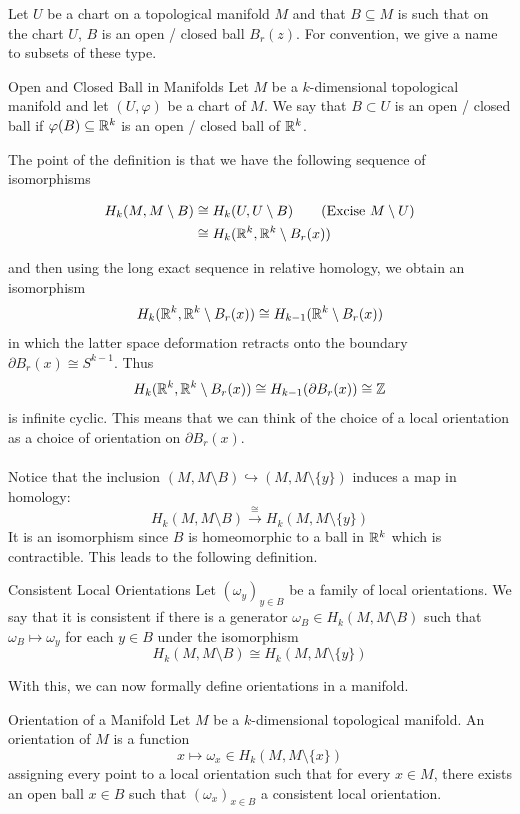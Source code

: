\documentclass[a4paper]{article}
\begin{document}
Let $U$ be a chart on a topological manifold $M$ and that $B\subseteq M$ is such that on the chart $U$, $B$ is an open / closed ball $B_r(z)$. For convention, we give a name to subsets of these type. 

\begin{defn}{Open and Closed Ball in Manifolds}{} Let $M$ be a $k$-dimensional topological manifold and let $(U,\varphi)$ be a chart of $M$. We say that $B\subset U$ is an open / closed ball if $\varphi(B)\subseteq\mathbb{R}^k$ is an open / closed ball of $\mathbb{R}^k$. 
\end{defn}

The point of the definition is that we have the following sequence of isomorphisms 

\begin{align*}
H_k(M,M\setminus B)&\cong H_k(U,U\setminus B)\tag{Excise $M\setminus U$}\\
&\cong H_k(\mathbb{R}^k,\mathbb{R}^k\setminus B_r(x))
\end{align*}

and then using the long exact sequence in relative homology, we obtain an isomorphism $$H_k(\mathbb{R}^k,\mathbb{R}^k\setminus B_r(x))\cong H_{k-1}(\mathbb{R}^k\setminus B_r(x))$$ in which the latter space deformation retracts onto the boundary $\partial B_r(x)\cong S^{k-1}$. Thus $$H_k(\mathbb{R}^k,\mathbb{R}^k\setminus B_r(x))\cong H_{k-1}(\partial B_r(x))\cong\mathbb{Z}$$ is infinite cyclic. This means that we can think of the choice of a local orientation as a choice of orientation on $\partial B_r(x)$. \\~\\

Notice that the inclusion $(M,M\setminus B)\hookrightarrow(M,M\setminus\{y\})$ induces a map in homology: $$H_k(M,M\setminus B)\overset{\cong}{\rightarrow}H_k(M,M\setminus\{y\})$$ It is an isomorphism since $B$ is homeomorphic to a ball in $\mathbb{R}^k$ which is contractible. This leads to the following definition. 

\begin{defn}{Consistent Local Orientations}{} Let $(\omega_y)_{y\in B}$ be a family of local orientations. We say that it is consistent if there is a generator $\omega_B\in H_k(M,M\setminus B)$ such that $\omega_B\mapsto\omega_y$ for each $y\in B$ under the isomorphism $$H_k(M,M\setminus B)\cong H_k(M,M\setminus\{y\})$$
\end{defn}

With this, we can now formally define orientations in a manifold. 

\begin{defn}{Orientation of a Manifold}{} Let $M$ be a $k$-dimensional topological manifold. An orientation of $M$ is a function $$x\mapsto\omega_x\in H_k(M,M\setminus\{x\})$$ assigning every point to a local orientation such that for every $x\in M$, there exists an open ball $x\in B$ such that $(\omega_x)_{x\in B}$ a consistent local orientation. 
\end{defn}
\end{document}
